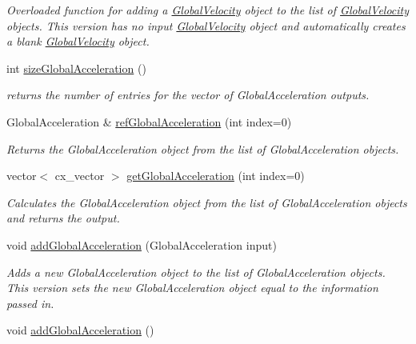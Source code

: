 \begin{DoxyCompactItemize}
\begin{DoxyCompactList}\small\item\em Overloaded function for adding a \hyperlink{class_global_velocity}{Global\-Velocity} object to the list of \hyperlink{class_global_velocity}{Global\-Velocity} objects. This version has no input \hyperlink{class_global_velocity}{Global\-Velocity} object and automatically creates a blank \hyperlink{class_global_velocity}{Global\-Velocity} object. \end{DoxyCompactList}\item 
int \hyperlink{class_outputs_body_a4265e0ece0f65f6ee6b3e36fc66bf960}{size\-Global\-Acceleration} ()
\begin{DoxyCompactList}\small\item\em returns the number of entries for the vector of Global\-Acceleration outputs. \end{DoxyCompactList}\item 
Global\-Acceleration \& \hyperlink{class_outputs_body_a7be24ef361c2dcd9c6b9c62d58ee34bd}{ref\-Global\-Acceleration} (int index=0)
\begin{DoxyCompactList}\small\item\em Returns the Global\-Acceleration object from the list of Global\-Acceleration objects. \end{DoxyCompactList}\item 
vector$<$ cx\-\_\-vector $>$ \hyperlink{class_outputs_body_a9c4de0023e30be8e03c4f910a3848bdc}{get\-Global\-Acceleration} (int index=0)
\begin{DoxyCompactList}\small\item\em Calculates the Global\-Acceleration object from the list of Global\-Acceleration objects and returns the output. \end{DoxyCompactList}\item 
void \hyperlink{class_outputs_body_a38f7909d116feefc04acc11f58515c8c}{add\-Global\-Acceleration} (Global\-Acceleration input)
\begin{DoxyCompactList}\small\item\em Adds a new Global\-Acceleration object to the list of Global\-Acceleration objects. This version sets the new Global\-Acceleration object equal to the information passed in. \end{DoxyCompactList}\item 
\hypertarget{class_outputs_body_a3205155873f5db270a71377e5ff80bb4}{void \hyperlink{class_outputs_body_a3205155873f5db270a71377e5ff80bb4}{add\-Global\-Acceleration} ()}\label{class_outputs_body_a3205155873f5db270a71377e5ff80bb4}


\end{DoxyCompactItemize}
